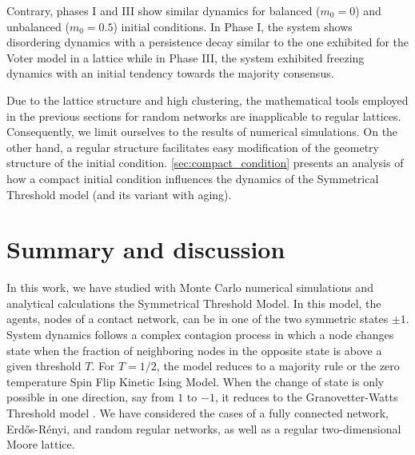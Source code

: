 Contrary, phases I and III show similar dynamics for balanced ($m_0 = 0$) and unbalanced ($m_0 = 0.5$) initial conditions. In Phase I, the system shows disordering dynamics with a persistence decay similar to the one exhibited for the Voter model in a lattice \cite{ben-naim-1996} while in Phase III, the system exhibited freezing dynamics with an initial tendency towards the majority consensus.

Due to the lattice structure and high clustering, the mathematical tools employed in the previous sections for random networks are inapplicable to regular lattices. Consequently, we limit ourselves to the results of numerical simulations. On the other hand, a regular structure facilitates easy modification of the geometry structure of the initial condition. \ref{sec:compact_condition} presents an analysis of how a compact initial condition influences the dynamics of the Symmetrical Threshold model (and its variant with aging).



\section{\label{sec:Summary and Conclusions} Summary and discussion}

In this work, we have studied with Monte Carlo numerical simulations and analytical calculations the Symmetrical Threshold Model. In this model, the agents, nodes of a contact  network, can be in one of the two symmetric states $\pm 1$.  System dynamics follows a complex contagion process in which a node changes state when the fraction of neighboring nodes in the opposite state is above a given threshold $T$. For $T=1/2$, the model reduces to a majority rule or the zero temperature Spin Flip Kinetic Ising Model. When the change of state is only possible in one direction, say from $1$ to $-1$, it reduces to the Granovetter-Watts Threshold model \cite{granovetter-1978,watts-2002,Abella-2022-AME}. We have considered the cases of a fully connected network, Erd\H{o}s-Rényi, and random regular networks, as well as a regular two-dimensional Moore lattice. 

